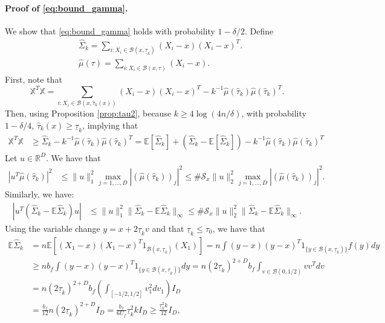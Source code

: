\paragraph{Proof of \eqref{eq:bound_gamma}.} We show that \eqref{eq:bound_gamma} holds with probability $1-\delta/ 2 $. Define 
\begin{align*}
&\hat \Sigma_k =  \sum_{i : X_i \in \mathcal B (x,    \underline \tau_k ) } (X_i-x  )(X_i-x )^T. \\
&\hat \mu(\tau)  =  \sum_{i : X_i \in \mathcal B (x,    \tau ) } (X_i-x  ).
\end{align*} 
First, note that
\begin{equation*}
  \mathbb X^T \mathbb X = \sum_{i : X_i \in \mathcal B (x, \hat \tau_k(x)) }      (X_i -x) (X_i -x) ^T - k^{-1}  \hat \mu( \hat \tau_ k )\hat \mu( \hat \tau_ k )^{T}.
\end{equation*}
Then, using Proposition \ref{prop:tau2}, because $ k\geq 4   \log( 4n/\delta)  $, with probability $1-\delta/4$, $\hat \tau_k(x)\geq \underline \tau_k$, implying that
\begin{align*}
    \mathbb X^T \mathbb X &\geq  \hat \Sigma_k   - k^{-1}  \hat \mu( \hat \tau_ k )\hat \mu( \hat \tau_ k )  ^{ T}   =     \mathbb E [\hat \Sigma_k  ] +  (\hat \Sigma_k  - \mathbb E [\hat \Sigma_k  ] )  - k^{-1}  \hat \mu( \hat \tau_ k )\hat \mu( \hat \tau_ k )  ^{ T} 
\end{align*} 
Let $u\in \mathbb R^D$. We have that
\begin{align*}
|u^T \hat \mu( \hat \tau_ k ) |^2  &\leq  \|u\|_1^2 \max_{j=1,\ldots, D}  | (\hat \mu( \hat \tau_ k ))_j |^2\leq  \#\mathcal S_x \|u\|_2^2  \max_{j=1,\ldots, D}  | (\hat \mu( \hat \tau_ k ))_j |^2.
\end{align*}
Similarly, we have:
\begin{align*}
 | u^T (\hat \Sigma_k - \mathbb E \hat \Sigma_k)  u |  &\leq  \|u\|_1^2 \| \hat \Sigma_k - \mathbb E \hat \Sigma_k\|_\infty    \leq   \#\mathcal S_x \|u\|_2^2 \| \hat \Sigma_k - \mathbb E \hat \Sigma_k\|_\infty   .
\end{align*}
Using the variable change $y = x+ 2\underline \tau_k v$ and that $ \underline \tau_k    \leq  \tau_0  $, we have that
\begin{align*}
\mathbb E \hat \Sigma_k  &= n \mathbb E [  (X_1-x) (X_1-x)^T 1_{ \mathcal B (x, \underline    \tau_k) }(X_1)]  = n\int    ( y -x) ( y -x) ^T 1_{\{y\in \mathcal B (x,    \underline  \tau_k ) \}} f(y)d y\\
&\geq n   b_f \int    ( y -x) ( y -x) ^T 1_{\{ y\in\mathcal B (x,    \underline  \tau_k ) \}} d y=  n (2\underline \tau_k ) ^{2+D} b_f  \int_{v\in \mathcal B (0,1/2) } vv^T   dv\\
& =    n(2\underline \tau_k ) ^{2+D} b_f\left(  \int_{  [-1/2,1/2] } v_1^2  dv_1 \right) I_D  \\
&=  \frac {b_f }{12} n  (2\underline \tau_k ) ^{2+D}    I_D = \frac {b_f }{6 U_f}   \underline \tau_k  ^{2 } k    I_D \geq \frac { \underline \tau_k  ^{2 } k  }{12 }     I_D,
\end{align*}
